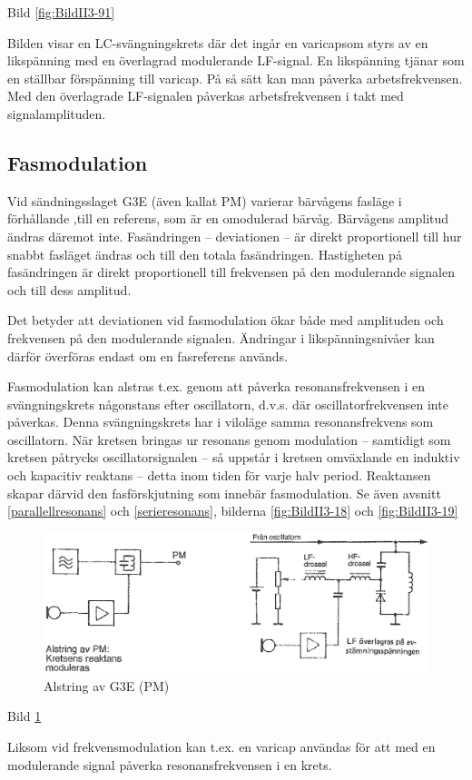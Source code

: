 Bild \ref{fig:BildII3-91}

Bilden visar en LC-svängningskrets där det ingår en varicapsom styrs
av en likspänning med en överlagrad modulerande LF-signal. En
likspänning tjänar som en ställbar förspänning till varicap. På så
sätt kan man påverka arbetsfrekvensen. Med den överlagrade LF-signalen
påverkas arbetsfrekvensen i takt med signalamplituden.

\subsection{Fasmodulation}

Vid sändningsslaget G3E (även kallat PM) varierar bärvågens fasläge i
förhållande ,till en referens, som är en omodulerad bärvåg.  Bärvågens
amplitud ändras däremot inte. Fasändringen -- deviationen -- är direkt
proportionell till hur snabbt fasläget ändras och till den totala
fasändringen. Hastigheten på fasändringen är direkt proportionell till
frekvensen på den modulerande signalen och till dess amplitud.

Det betyder att deviationen vid fasmodulation ökar både med amplituden
och frekvensen på den modulerande signalen. Ändringar i
likspänningsnivåer kan därför överföras endast om en fasreferens
används.

Fasmodulation kan alstras t.ex. genom att påverka resonansfrekvensen i
en svängningskrets någonstans efter oscillatorn, d.v.s.  där
oscillatorfrekvensen inte påverkas. Denna svängningskrets har i
viloläge samma resonansfrekvens som oscillatorn. När kretsen bringas
ur resonans genom modulation -- samtidigt som kretsen påtrycks
oscillatorsignalen -- så uppstår i kretsen omväxlande en induktiv och
kapacitiv reaktans -- detta inom tiden för varje halv period. Reaktansen
skapar därvid den fasförskjutning som innebär fasmodulation. Se även
avsnitt \ref{parallellresonans} och \ref{serieresonans}, bilderna
\ref{fig:BildII3-18} och \ref{fig:BildII3-19}

\begin{figure}
\includegraphics[width=\textwidth]{images/bild_2_3-92.png}
\caption{Alstring av G3E (PM)}
\label{fig:BildII3-92}
\end{figure}

Bild \ref{fig:BildII3-92}

Liksom vid frekvensmodulation kan t.ex. en varicap användas för att
med en modulerande signal påverka resonansfrekvensen i en krets.
